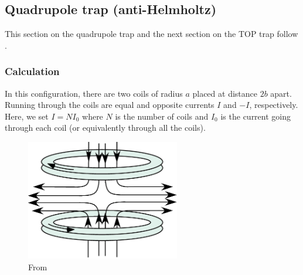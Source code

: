 \documentclass{book}
\theoremstyle{definition}
\begin{document}
\subsection*{Quadrupole trap (anti-Helmholtz)}

This section on the quadrupole trap and the next section on the TOP trap follow \cite{perez2013does}.

\subsubsection*{Calculation}


In this configuration, there are two coils of radius $a$ placed at distance $2b$ apart. Running through the coils are equal and opposite currents $I$ and $-I$, respectively. Here, we set $I = NI_0$ where $N$ is the number of coils and $I_0$ is the current going through each coil (or equivalently through all the coils).

\begin{figure}[!htb]
	\centering
	\includegraphics[width=0.6\textwidth]{images/antiHelmholtz.png}
	\caption{From \cite{maruyama2003optical}}
\end{figure}
\end{document}

